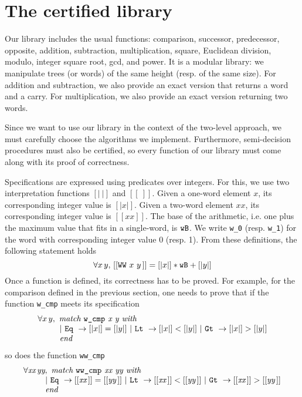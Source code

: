 \section{The certified library \label{Op}}
Our library includes the usual functions:
comparison, successor, predecessor, opposite, addition, subtraction,
multiplication, square, Euclidean division, modulo, integer square root, gcd, 
and power.
It is a modular library: we manipulate trees (or words)
of the same height (resp. of the same size). 
For addition and subtraction, we also provide an exact version
that returns a word and a carry.
For multiplication, we also provide an exact version
returning two words. 

Since we want to use our library in the context of the two-level approach,
we must carefully choose the algorithms we implement.
Furthermore, semi-decision procedures must also be certified, 
so every function of our library must come along with its proof 
of correctness. 

Specifications are expressed using predicates over integers. For this, 
we use two interpretation functions
{$ [|\ |]$} and {$[[\ ]]$}.
Given a one-word element $x$, its corresponding integer value
is $[|x|]$. Given a two-word element $\textit{xx}$, its corresponding
integer value is $[[\textit{xx}]]$. The base of the arithmetic, i.e.
one plus the maximum value that fits in a single-word, is ${\texttt{wB}}$. 
We write {\tt w\_0} (resp. {\tt w\_1}) for the word with 
corresponding integer value 0 (resp. 1).
From these definitions, the following statement holds
$$\forall x\, y,\, [[\texttt{WW}\,\,x\,\,y\,]] = [|x|] * {\texttt{wB}} + [|y|]$$
Once a function is defined, its correctness has to be proved.
For example, for the comparison defined in the previous section,
one needs to prove that if the function {\tt w\_cmp} meets its specification
$$\begin{array}{l}
\forall x\, y, \,\, \textit{match {\tt w\_cmp} x y with} \\
\qquad\,\,\,\,
 |\,\, \texttt{Eq}\,\, \rightarrow [|x|] = [|y|]\,\, | \,\,\texttt{Lt}\,\, \rightarrow [|x|] < [|y|] \,\,
| \,\,\texttt{Gt}\,\, \rightarrow [|x|] > [|y|]\\
\qquad\,\,\,\, \textit{end}
\end{array}
$$
so does the function {\tt ww\_cmp}
$$\begin{array}{l}
\forall \textit{xx}\, \textit{yy}, \,\, \textit{match {\tt ww\_cmp} \textit{xx} \textit{yy} with} \\
\qquad\,\,\,\,
 |\,\, \texttt{Eq}\,\, \rightarrow [[\textit{xx}\, ]] = [[\textit{yy}\, ]]\,\, | \,\,\texttt{Lt}\,\, \rightarrow [[\textit{xx}\, ]] < [[\textit{yy}\, ]] \,\,
| \,\,\texttt{Gt}\,\, \rightarrow [[\textit{xx}\, ]] > [[\textit{yy}\, ]]\\
\qquad\,\,\,\, \textit{end}
\end{array}
$$

